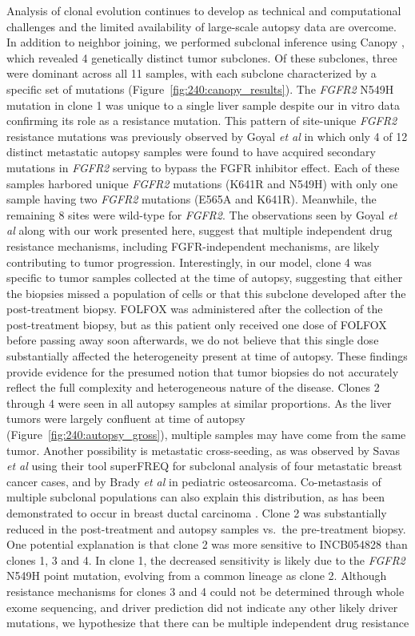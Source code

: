 Analysis of clonal evolution continues to develop as technical and computational challenges and the limited availability of large-scale autopsy data are overcome. In addition to neighbor joining, we performed subclonal inference using Canopy \cite{canopy}, which revealed 4 genetically distinct tumor subclones. Of these subclones, three were dominant across all 11 samples, with each subclone characterized by a specific set of mutations (Figure~\ref{fig:240:canopy_results}). The \textit{FGFR2} N549H mutation in clone 1 was unique to a single liver sample despite our in vitro data confirming its role as a resistance mutation. This pattern of site-unique \textit{FGFR2} resistance mutations was previously observed by Goyal \textit{et al} \cite{goyal2017} in which only 4 of 12 distinct metastatic autopsy samples were found to have acquired secondary mutations in \textit{FGFR2} serving to bypass the FGFR inhibitor effect. Each of these samples harbored unique \textit{FGFR2} mutations (K641R and N549H) with only one sample having two \textit{FGFR2} mutations (E565A and K641R)\@.  Meanwhile, the remaining 8 sites were wild-type for \textit{FGFR2}. The observations seen by Goyal \textit{et al} along with our work presented here, suggest that multiple independent drug resistance mechanisms, including FGFR-independent mechanisms, are likely contributing to tumor progression. Interestingly, in our model, clone 4 was specific to tumor samples collected at the time of autopsy, suggesting that either the biopsies missed a population of cells or that this subclone developed after the post-treatment biopsy. FOLFOX was administered after the collection of the post-treatment biopsy, but as this patient only received one dose of FOLFOX before passing away soon afterwards, we do not believe that this single dose substantially affected the heterogeneity present at time of autopsy. These findings provide evidence for the presumed notion that tumor biopsies do not accurately reflect the full complexity and heterogeneous nature of the disease. Clones 2 through 4 were seen in all autopsy samples at similar proportions. As the liver tumors were largely confluent at time of autopsy (Figure~\ref{fig:240:autopsy_gross}), multiple samples may have come from the same tumor. Another possibility is metastatic cross-seeding, as was observed by Savas \textit{et al} \cite{savas2016} using their tool superFREQ \cite{flensburg2020} for subclonal analysis of four metastatic breast cancer cases, and by Brady \textit{et al} \cite{brady2019} in pediatric osteosarcoma. Co-metastasis of multiple subclonal populations can also explain this distribution, as has been demonstrated to occur in breast ductal carcinoma \cite{casasent2018}. Clone 2 was substantially reduced in the post-treatment and autopsy samples vs.\ the pre-treatment biopsy. One potential explanation is that clone 2 was more sensitive to INCB054828 than clones 1, 3 and 4. In clone 1, the decreased sensitivity is likely due to the \textit{FGFR2} N549H point mutation, evolving from a common lineage as clone 2. Although resistance mechanisms for clones 3 and 4 could not be determined through whole exome sequencing, and driver prediction did not indicate any other likely driver mutations, we hypothesize that there can be multiple independent drug resistance 
